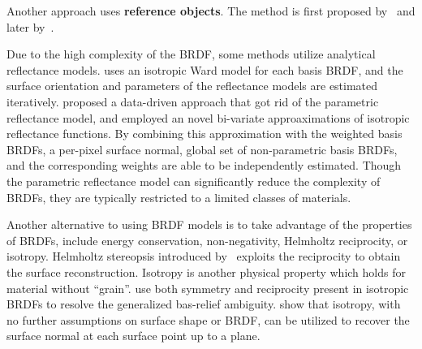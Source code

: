 Another approach uses \textbf{reference objects}. The method is first proposed by~\citeauthor{silver1980determining} and later by~\citeauthor{hertzmann2005example}.

Due to the high complexity of the BRDF, some methods utilize {analytical reflectance models}. \citeauthor{goldman2010shape} uses an isotropic Ward model for each basis BRDF, and the surface orientation and parameters of the reflectance models are estimated iteratively. \citeauthor{alldrin2008photometric} proposed a data-driven approach that got rid of the parametric reflectance model, and employed an novel bi-variate approaximations of isotropic reflectance functions. By combining this approximation with the weighted basis BRDFs, a per-pixel surface normal, global set of non-parametric basis BRDFs, and the corresponding weights are able to be independently estimated. Though the parametric reflectance model can significantly reduce the complexity of BRDFs, they are typically restricted to a limited classes of materials.

Another alternative to using BRDF models is to take advantage of the properties of BRDFs, include energy conservation, non-negativity, Helmholtz reciprocity, or isotropy. Helmholtz stereopsis introduced by~\citeauthor{zickler2002helmholtz} exploits the reciprocity to obtain the surface reconstruction. Isotropy is another physical property which holds for material without ``grain''. \citeauthor{tan2007isotropy} use both symmetry and reciprocity present in isotropic BRDFs to resolve the generalized bas-relief ambiguity. \citeauthor{alldrin2007toward} show that isotropy, with no further assumptions on surface shape or BRDF, can be utilized to recover the surface normal at each surface point up to a plane.

